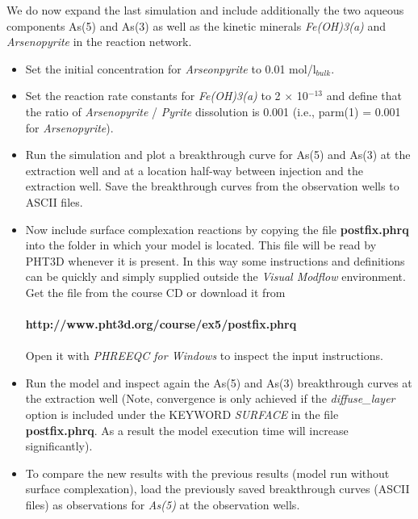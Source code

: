 We do now expand the last simulation and include additionally the two aqueous components As(5) and As(3) as well as the kinetic minerals \emph{Fe(OH)3(a)} and \emph{Arsenopyrite} in the reaction network. 

\begin{itemize}

\item Set the initial concentration for \emph{Arseonpyrite} to 0.01 mol/l$_{bulk}$.

\item Set the reaction rate constants for \emph{Fe(OH)3(a)} to 2 $\times$ 10$^{-13}$
and define that the ratio of \emph{Arsenopyrite} / \emph{Pyrite} dissolution 
is 0.001 (i.e., parm(1) = 0.001 for \emph{Arsenopyrite}).

\item Run the simulation and plot a breakthrough curve for As(5) and As(3) at the extraction well and at a location half-way between injection and the extraction well.
Save the breakthrough curves from the observation wells to ASCII files.

\item Now include surface complexation reactions by copying the file 
{\color{red} \textbf{postfix.phrq}} 
into the folder in which your model is located. This file will be read by PHT3D whenever it is present.
In this way some instructions and definitions can be quickly and simply 
supplied outside the \emph{Visual Modflow} environment.
Get the file from the course CD or download it from \\
\\
{\color{red} \textbf{http://www.pht3d.org/course/ex5/postfix.phrq}} \\
\\ 
Open it with \emph{PHREEQC for Windows} to inspect the input instructions.  

\item Run the model and inspect again the As(5) and As(3) breakthrough curves at the extraction well
(Note, convergence is only achieved if the \emph{diffuse\_layer} option 
is included under the KEYWORD \emph{SURFACE} in the file
{\color{red} \textbf{postfix.phrq}}.
As a result the model execution time will increase significantly).

\item To compare the new results with the previous results (model run without surface complexation),
load the previously saved breakthrough curves (ASCII files) as observations for \emph{As(5)} at the
observation wells. 

\end{itemize}

